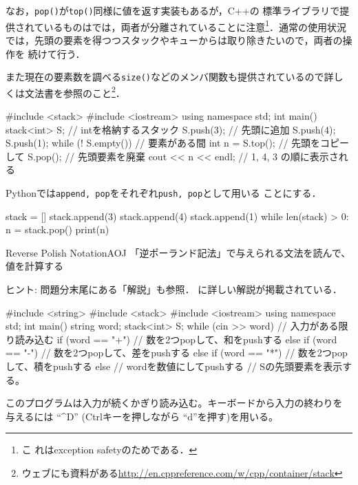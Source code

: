 なお，\texttt{pop()}が\texttt{top()}同様に値を返す実装もあるが，C++の
標準ライブラリで提供されているものはでは，両者が分離されていることに注意\footnote{こ
  れはexception safetyのためである．}．通常の使用状況では，先頭の要素を得つつスタックやキューからは取り除きたいので，両者の操作を
続けて行う．

また現在の要素数を調べる\texttt{size()}などのメンバ関数も提供されているので詳しくは文法書を参照のこと\footnote{ウェブにも資料がある\url{http://en.cppreference.com/w/cpp/container/stack}}．

\begin{cbox}[emph={stack,push,top,pop}]
#include <stack>
#include <iostream>
using namespace std;
int main() {
    stack<int> S; // intを格納するスタック
    S.push(3); // 先頭に追加
    S.push(4);
    S.push(1);
    while (! S.empty()) { // 要素がある間
	int n = S.top(); // 先頭をコピーして
	S.pop(); // 先頭要素を廃棄
	cout << n << endl; // 1, 4, 3  の順に表示される
    }
}  
\end{cbox}

Pythonでは\texttt{append, pop}をそれぞれ\texttt{push, pop}として用いる
ことにする．
\begin{pybox}[emph={append,pop}]
stack = []
stack.append(3)
stack.append(4)
stack.append(1)
while len(stack) > 0:
    n = stack.pop()
    print(n)
\end{pybox}

\begin{psbox}{Reverse Polish Notation}{AOJ}
「逆ポーランド記法」で与えられる文法を読んで、値を計算する
  
\end{psbox}

ヒント: 問題分末尾にある「解説」も参照．
\pcaojbook[p.82]に詳しい解説が掲載されている．

\begin{cbox}[emph={string,stack,top,push}]
#include <string>
#include <stack>
#include <iostream>
using namespace std;
int main() {
  string word;
  stack<int> S;
  while (cin >> word) { // 入力がある限り読み込む
    if (word == "+") {
      // 数を2つpopして、和をpushする
    }
    else if (word == "-") {
      // 数を2つpopして、差をpushする
    }
    else if (word == "*") {
      // 数を2つpopして、積をpushする
    }
    else {
      // wordを数値にしてpushする
    }
  }
  // Sの先頭要素を表示する。
}
\end{cbox}

このプログラムは入力が続くかぎり読み込む。キーボードから入力の終わりを
与えるには ``\textasciicircum{}D'' (Ctrlキーを押しながら ``d''を押す)を用いる。

